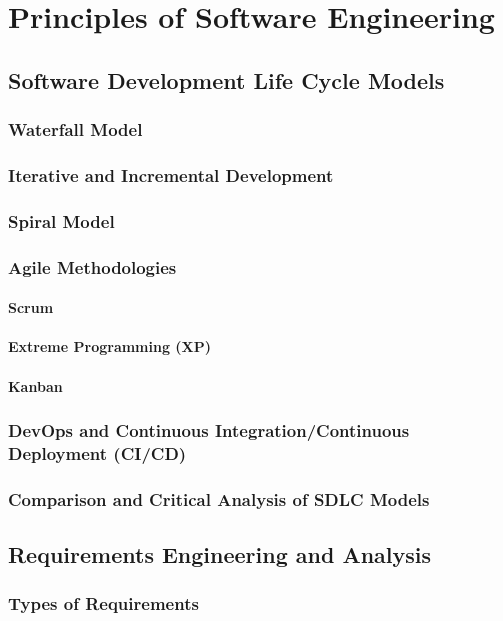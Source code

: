 \chapter{Principles of Software Engineering}

\section{Software Development Life Cycle Models}
\subsection{Waterfall Model}
\subsection{Iterative and Incremental Development}
\subsection{Spiral Model}
\subsection{Agile Methodologies}
\subsubsection{Scrum}
\subsubsection{Extreme Programming (XP)}
\subsubsection{Kanban}
\subsection{DevOps and Continuous Integration/Continuous Deployment (CI/CD)}
\subsection{Comparison and Critical Analysis of SDLC Models}

\newpage

\section{Requirements Engineering and Analysis}
\subsection{Types of Requirements}
